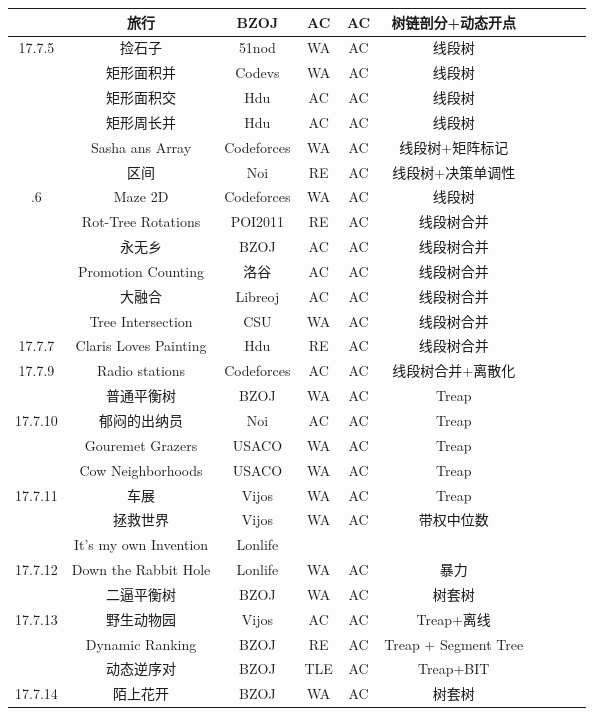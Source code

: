 \documentclass[landscape]{article}
\begin{document}
\begin{longtable}{cccccccccc}
  & 旅行 & BZOJ & AC & AC & 树链剖分+动态开点\\
  \hline
  17.7.5 & 捡石子 & 51nod & WA & AC & 线段树\\
  & 矩形面积并 & Codevs & WA & AC & 线段树\\
  & 矩形面积交 & Hdu & AC & AC & 线段树\\
  & 矩形周长并 & Hdu & AC & AC & 线段树\\
  & Sasha ans Array & Codeforces & WA & AC & 线段树+矩阵标记\\
  & 区间 & Noi & RE & AC & 线段树+决策单调性\\
  \newpage
  \hline
  17.7.6 & Maze 2D & Codeforces & WA & AC & 线段树\\
  & Rot-Tree Rotations & POI2011 & RE & AC & 线段树合并\\
  & 永无乡 & BZOJ & AC & AC & 线段树合并\\
  & Promotion Counting & 洛谷 & AC & AC & 线段树合并\\
  & 大融合 & Libreoj & AC & AC & 线段树合并\\
  & Tree Intersection & CSU & WA & AC & 线段树合并\\
  \hline
  17.7.7 & Claris Loves Painting & Hdu & RE & AC & 线段树合并\\
  \hline
  17.7.9 & Radio stations & Codeforces & AC & AC & 线段树合并+离散化\\
  & 普通平衡树 & BZOJ & WA & AC & Treap\\
  \hline
  17.7.10 & 郁闷的出纳员 & Noi & AC & AC & Treap\\
  & Gouremet Grazers & USACO & WA & AC & Treap\\
  & Cow Neighborhoods & USACO & WA & AC & Treap\\
  \hline
  17.7.11 & 车展 & Vijos & WA & AC &Treap\\
  & 拯救世界 & Vijos & WA & AC & 带权中位数\\
  & It's my own Invention & Lonlife\\
  \hline
  17.7.12 & Down the Rabbit Hole & Lonlife & WA & AC & 暴力\\
  & 二逼平衡树 & BZOJ & WA & AC & 树套树\\
  \hline
  17.7.13 & 野生动物园 &  Vijos & AC & AC & Treap+离线\\
  & Dynamic Ranking & BZOJ & RE & AC & Treap + Segment Tree\\
  & 动态逆序对 & BZOJ & TLE & AC & Treap+BIT\\
  \hline
  17.7.14 & 陌上花开 & BZOJ & WA & AC & 树套树\\

\end{longtable}
\end{document}
